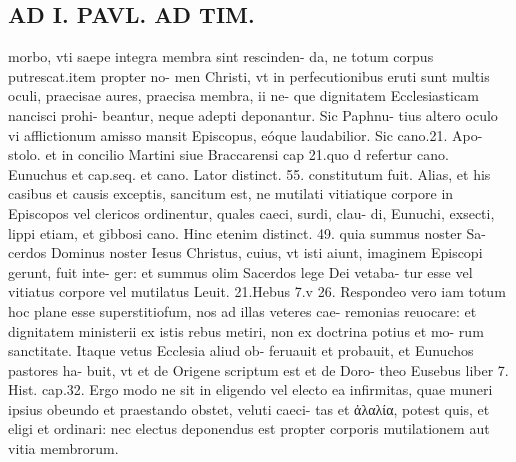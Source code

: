 \documentclass{article}
\begin{document}
\begin{pages}
\section*{AD I. PAVL. AD TIM. }
\marginpar{[ p.124 ]}\pstart morbo, vti saepe integra membra sint rescinden- da, ne totum corpus putrescat.item propter no- men Christi, vt in perfecutionibus eruti sunt multis oculi, praecisae aures, praecisa membra, ii ne- que dignitatem Ecclesiasticam nancisci prohi- beantur, neque adepti deponantur. Sic Paphnu- tius altero oculo vi afflictionum amisso mansit Episcopus, eóque laudabilior. Sic cano.21. Apo- stolo. et in concilio Martini siue Braccarensi cap 21.quo d refertur cano. Eunuchus et cap.seq. et cano. Lator distinct. 55. constitutum fuit.  \pend\pstart Alias, et his casibus et causis exceptis, sancitum est, ne mutilati vitiatique corpore in Episcopos vel clericos ordinentur, quales caeci, surdi, clau- di, Eunuchi, exsecti, lippi etiam, et gibbosi cano. Hinc etenim distinct. 49. quia summus noster Sa- cerdos Dominus noster Iesus Christus, cuius, vt isti aiunt, imaginem Episcopi gerunt, fuit inte- ger: et summus olim Sacerdos lege Dei vetaba- tur esse vel vitiatus corpore vel mutilatus Leuit. 21.Hebus 7.v 26. Respondeo vero iam totum hoc plane esse superstitiofum, nos ad illas veteres cae- remonias reuocare: et dignitatem ministerii ex istis rebus metiri, non ex doctrina potius et mo- rum sanctitate. Itaque vetus Ecclesia aliud ob- feruauit et probauit, et Eunuchos pastores ha- buit, vt et de Origene scriptum est et de Doro- theo Eusebus liber  7. Hist. cap.32. Ergo modo ne sit in eligendo vel electo ea infirmitas, quae muneri ipsius obeundo et praestando obstet, veluti caeci- tas et ἀλαλία, potest quis, et eligi et ordinari: nec electus deponendus est propter corporis mutilationem aut vitia membrorum.  \pend

\end{pages}
\end{document}
